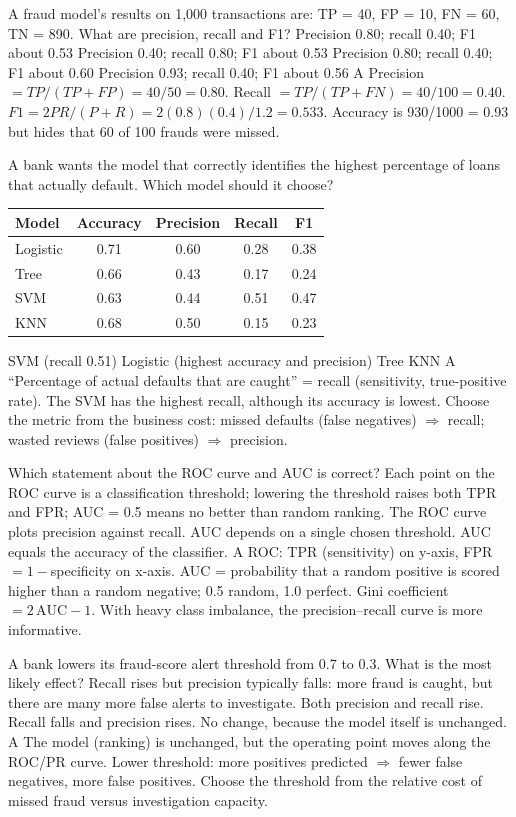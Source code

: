 {A fraud model's results on 1{,}000 transactions are: TP = 40, FP = 10, FN = 60, TN = 890. What are precision, recall and F1?}
{Precision 0.80; recall 0.40; F1 about 0.53}
{Precision 0.40; recall 0.80; F1 about 0.53}
{Precision 0.80; recall 0.40; F1 about 0.60}
{Precision 0.93; recall 0.40; F1 about 0.56}
{A}
{Precision $=TP/(TP+FP)=40/50=0.80$. Recall $=TP/(TP+FN)=40/100=0.40$. $F1=2PR/(P+R)=2(0.8)(0.4)/1.2=0.533$. Accuracy is 930/1000 = 0.93 but hides that 60 of 100 frauds were missed.}

{A bank wants the model that correctly identifies the highest percentage of loans that actually default. Which model should it choose?
	\begin{center}\small
		\begin{tabular}{@{}lcccc@{}}
			\toprule
			Model & Accuracy & Precision & Recall & F1 \\
			\midrule
			Logistic & 0.71 & 0.60 & 0.28 & 0.38 \\
			Tree & 0.66 & 0.43 & 0.17 & 0.24 \\
			SVM & 0.63 & 0.44 & 0.51 & 0.47 \\
			KNN & 0.68 & 0.50 & 0.15 & 0.23 \\
			\bottomrule
\end{tabular}\end{center}}
{SVM (recall 0.51)}
{Logistic (highest accuracy and precision)}
{Tree}
{KNN}
{A}
{``Percentage of actual defaults that are caught'' = recall (sensitivity, true-positive rate). The SVM has the highest recall, although its accuracy is lowest. Choose the metric from the business cost: missed defaults (false negatives) $\Rightarrow$ recall; wasted reviews (false positives) $\Rightarrow$ precision.}

{Which statement about the ROC curve and AUC is correct?}
{Each point on the ROC curve is a classification threshold; lowering the threshold raises both TPR and FPR; AUC = 0.5 means no better than random ranking.}
{The ROC curve plots precision against recall.}
{AUC depends on a single chosen threshold.}
{AUC equals the accuracy of the classifier.}
{A}
{ROC: TPR (sensitivity) on y-axis, FPR $=1-$specificity on x-axis. AUC = probability that a random positive is scored higher than a random negative; 0.5 random, 1.0 perfect. Gini coefficient $=2\,\text{AUC}-1$. With heavy class imbalance, the precision--recall curve is more informative.}

{A bank lowers its fraud-score alert threshold from 0.7 to 0.3. What is the most likely effect?}
{Recall rises but precision typically falls: more fraud is caught, but there are many more false alerts to investigate.}
{Both precision and recall rise.}
{Recall falls and precision rises.}
{No change, because the model itself is unchanged.}
{A}
{The model (ranking) is unchanged, but the operating point moves along the ROC/PR curve. Lower threshold: more positives predicted $\Rightarrow$ fewer false negatives, more false positives. Choose the threshold from the relative cost of missed fraud versus investigation capacity.}

